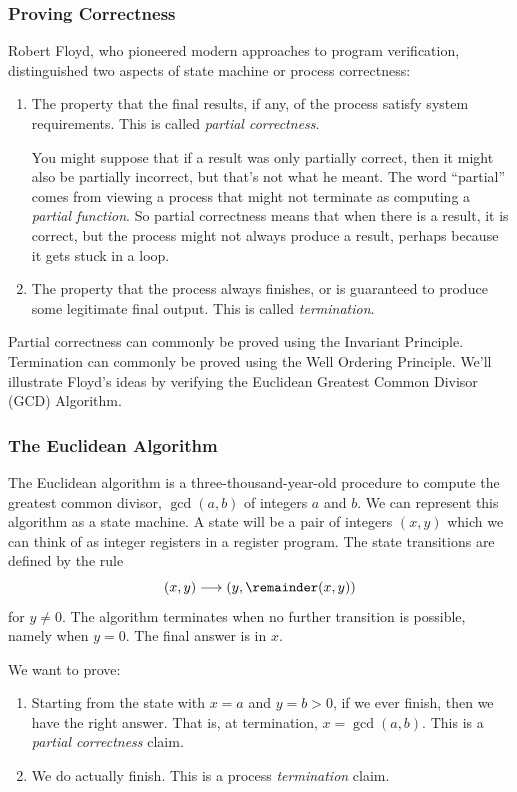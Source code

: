 \subsubsection{Proving Correctness}

Robert Floyd, who pioneered modern approaches to program verification,
distinguished two aspects of state machine or process correctness:

\begin{enumerate}
\item The property that the final results, if any, of the process satisfy
system requirements.  This is called \emph{partial correctness}.

You might suppose that if a result was only partially correct, then it
might also be partially incorrect, but that's not what he meant.  The word
``partial'' comes from viewing a process that might not terminate as
computing a \emph{partial function}.  So partial correctness means that
when there is a result, it is correct, but the process might not always
produce a result, perhaps because it gets stuck in a loop.

\item The property that the process always finishes, or is guaranteed to
produce some legitimate final output.  This is called \emph{termination}.
\end{enumerate}

Partial correctness can commonly be proved using the Invariant Principle.
Termination can commonly be proved using the Well Ordering Principle.
We'll illustrate Floyd's ideas by verifying the Euclidean Greatest Common
Divisor (GCD) Algorithm.

\subsubsection{The Euclidean Algorithm}\label{euclid}

The Euclidean algorithm is a three-thousand-year-old procedure to compute
the greatest common divisor, $\gcd(a,b)$ of integers $a$ and $b$.
We can represent this algorithm as a state machine.  A state will be a
pair of integers $(x,y)$ which we can think of as integer registers in a
register program.  The state transitions are defined by the rule
\[
(x,y) \movesto (y, \remainder(x,y))
\]
for $y \neq 0$.  The algorithm terminates when no further transition is
possible, namely when $y=0$.  The final answer is in $x$.

We want to prove:
\begin{enumerate}
\item Starting from the state with $x = a$ and $y = b>0$, if we ever finish,
then we have the right answer.  That is, at termination, $x = \gcd(a,b)$.
This is a \emph{partial correctness} claim.

\item We do actually finish.  This is a process \emph{termination} claim.

\end{enumerate}

